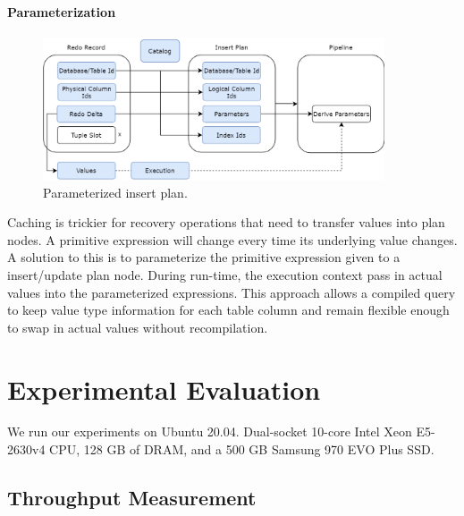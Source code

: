 \documentclass[12pt]{cmuthesis}
\begin{document}
\subsubsection{Parameterization}
\begin{figure}[H]
\centering
\includegraphics[width=0.9\textwidth]{images/ParameterizedRedoRecord.png}
\caption{Parameterized insert plan.}
\label{fig:parameterization}
\end{figure}

Caching is trickier for recovery operations that need to transfer values into plan nodes. A primitive expression will change every time its underlying value changes. A solution to this is to parameterize the primitive expression given to a insert/update plan node. During run-time, the execution context pass in actual values into the parameterized expressions. This approach allows a compiled query to keep value type information for each table column and remain flexible enough to swap in actual values without recompilation.

\chapter{Experimental Evaluation}
We run our experiments on Ubuntu 20.04.
Dual-socket 10-core Intel Xeon E5-2630v4 CPU, 128 GB of DRAM, and a 500 GB Samsung 970 EVO Plus SSD.

\section{Throughput Measurement}
\end{document}
